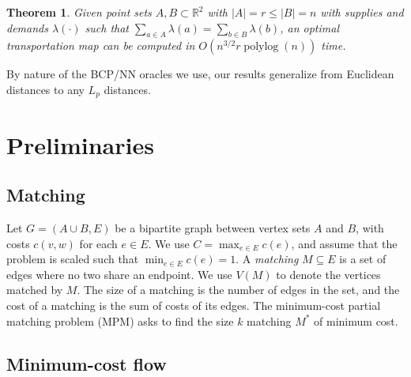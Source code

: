\documentclass[11pt]{article}
\def\polylog{\mathop{\mathrm{polylog}}}
\def\tsupply{\lambda}
\theoremstyle{plain}
\newtheorem{theorem}{Theorem}
\begin{document}
\begin{theorem}
\label{theorem:orlin}
Given point sets $A, B \subset \mathbb{R}^2$ with $|A| = r \leq |B| = n$ with
supplies and demands $\tsupply(\cdot)$ such that
$\sum_{a \in A} \tsupply(a) = \sum_{b \in B} \tsupply(b)$, an optimal
transportation map can be computed in $O(n^{3/2}r\polylog(n))$ time.
\end{theorem}



By nature of the BCP/NN oracles we use, our results generalize from Euclidean
distances to any $L_p$ distances.

\section{Preliminaries}
\label{section:prelim}

\subsection{Matching}

Let $G = (A \cup B, E)$ be a bipartite graph between vertex sets $A$ and $B$,
with costs $c(v, w)$ for each $e \in E$.
We use $C = \max_{e \in E} c(e)$, and assume that the problem is scaled such
that $\min_{e \in E} c(e) = 1$.
A \emph{matching} $M \subseteq E$ is a set of edges where no two share an
endpoint.
We use $V(M)$ to denote the vertices matched by $M$.
The size of a matching is the number of edges in the set, and the cost of a
matching is the sum of costs of its edges.
The minimum-cost partial matching problem (MPM) asks to find the size $k$
matching $M^*$ of minimum cost.

\subsection{Minimum-cost flow}
\end{document}
